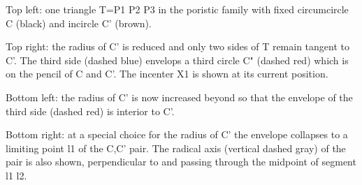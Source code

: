 Top left: one triangle T=P1 P2 P3 in the poristic family with fixed circumcircle C (black) and incircle C' (brown).

Top right: the radius of  C' is reduced and only two sides of T remain tangent to C'. The third side (dashed blue) envelops a third circle C" (dashed red) which is on the pencil of C and C'. The incenter X1 is shown at its current position.

Bottom left: the radius of C' is now increased beyond so that the envelope of the third side (dashed red) is interior to C'.

Bottom right: at a special choice for the radius of C' the envelope collapses to a limiting point l1 of the C,C' pair. The radical axis (vertical dashed gray) of the pair is also shown, perpendicular to and passing through the midpoint of segment l1 l2.